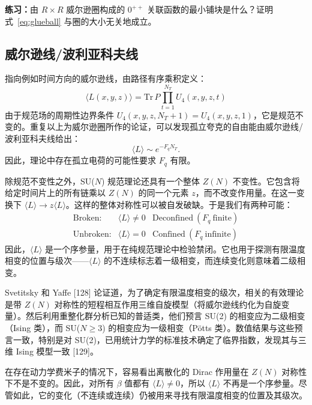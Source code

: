 \textbf{练习：}由 $R \times R$ 威尔逊圈构成的 $0^{++}$ 关联函数的最小铺块是什么？证明式~\eqref{eq:glueball} 与圈的大小无关地成立。

\subsection{威尔逊线/波利亚科夫线}
\label{sec:wilson-polyakov-line}

指向例如时间方向的威尔逊线，由路径有序乘积定义：
\begin{equation}
  \langle L(x,y,z)\rangle = \mathrm{Tr}\, P \prod_{t=1}^{N_T}
    U_4(x,y,z,t)
  \label{eq:polyakov}
\end{equation}
由于规范场的周期性边界条件 $U_4(x,y,z,N_T+1) = U_4(x,y,z,1)$，它是规范不变的。重复以上为威尔逊圈所作的论证，可以发现孤立夸克的自由能由威尔逊线/波利亚科夫线给出：
\begin{equation}
  \langle L\rangle \sim e^{-F_q N_T}.
  \label{eq:free-energy}
\end{equation}
因此，理论中存在孤立电荷的可能性要求 $F_q$ 有限。

除规范不变性之外，SU($N$) 规范理论还具有一个整体 $Z(N)$ 不变性。它包含将给定时间片上的所有链乘以 $Z(N)$ 的同一个元素 $z$，而不改变作用量。在这一变换下 $\langle L\rangle \to z\langle L\rangle$。这样的整体对称性可以被自发破缺。于是我们有两种可能：
\begin{equation}
  \begin{array}{lll}
    \text{Broken:} & \langle L\rangle \neq 0 & \text{Deconfined}\ (F_q\ \text{finite}) \\
    \text{Unbroken:} & \langle L\rangle = 0 & \text{Confined}\ (F_q\ \text{infinite})
  \end{array}
  \label{eq:order-param}
\end{equation}
因此，$\langle L\rangle$ 是一个序参量，用于在纯规范理论中检验禁闭。它也用于探测有限温度相变的位置与级次——$\langle L\rangle$ 的不连续标志着一级相变，而连续变化则意味着二级相变。

Svetitsky 和 Yaffe [128] 论证道，为了确定有限温度相变的级次，相关的有效理论是带 $Z(N)$ 对称性的短程相互作用三维自旋模型（将威尔逊线约化为自旋变量）。然后利用重整化群分析已知的普适类，他们预言 SU(2) 的相变应为二级相变（Ising 类），而 SU($N \geq 3$) 的相变应为一级相变（P\"otts 类）。数值结果与这些预言一致，特别是对 SU(2)，已用统计力学的标准技术确定了临界指数，发现其与三维 Ising 模型一致 [129]。

在存在动力学费米子的情况下，容易看出离散化的 Dirac 作用量在 $Z(N)$ 对称性下不是不变的。因此，对所有 $\beta$ 值都有 $\langle L\rangle \neq 0$，所以 $\langle L\rangle$ 不再是一个序参量。尽管如此，它的变化（不连续或连续）仍被用来寻找有限温度相变的位置及其级次。
